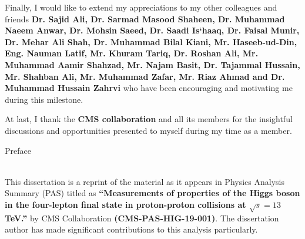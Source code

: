 \begin{acknowledgements}
	Finally, I would like to extend my appreciations to my other colleagues and friends \textbf{Dr. Sajid Ali, Dr. Sarmad Masood Shaheen, Dr. Muhammad Naeem Anwar, Dr. Mohsin Saeed, Dr. Saadi Is`haaq, Dr. Faisal Munir, Dr. Mehar Ali Shah, Dr. Muhammad Bilal Kiani, Mr. Haseeb-ud-Din, Eng. Nauman Latif, Mr. Khuram Tariq, Dr. Roshan Ali, Mr. Muhammad Aamir Shahzad, Mr. Najam Basit, Dr. Tajammal Hussain, Mr. Shahban Ali, Mr. Muhammad Zafar, Mr. Riaz Ahmad and Dr. Muhammad Hussain Zahrvi} who have been encouraging and motivating me during this milestone.


%
\par 
	At last, I thank the \textbf{CMS collaboration} and all its members for the insightful discussions and
opportunities presented to myself during my time as a member.

\clearpage 
\begin{center}
\huge{Preface} 
\end{center}
\vspace{2cm}
\normalsize 
\\
	This dissertation is a reprint of the material as it appears in Physics Analysis Summary (PAS) titled as \textbf{``Measurements of properties of the Higgs boson in the four-lepton final state in proton-proton collisions at $\sqrt{s} = 13$ TeV.''} by CMS Collaboration \textbf{(CMS-PAS-HIG-19-001)}. The dissertation author has made significant contributions to this analysis particularly.


\end{acknowledgements}
